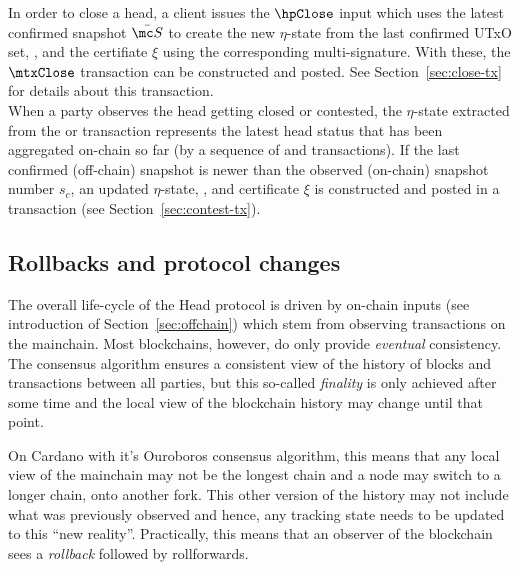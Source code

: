 \quad In order to close a head, a client issues the
$\hpClose$ input which uses the latest confirmed snapshot $\bar{\mc S}$ to
create the new $\eta$-state from the last confirmed UTxO set, , and the certifiate
$\xi$ using the corresponding multi-signature. With these, the $\mtxClose$ transaction
can be constructed and posted. See Section~\ref{sec:close-tx} for details about this
transaction. \\

\quad When a party observes
the head getting closed or contested, the $\eta$-state extracted from the
\mtxClose{} or \mtxContest{} transaction represents the latest head status that
has been aggregated on-chain so far (by a sequence of \mtxClose{} and
\mtxContest{} transactions). If the last confirmed (off-chain) snapshot is newer
than the observed (on-chain) snapshot number $s_{c}$, an updated $\eta$-state,
,
and certificate $\xi$ is constructed and posted in a \mtxContest{} transaction (see
Section~\ref{sec:contest-tx}).

\subsection{Rollbacks and protocol changes}\label{sec:rollbacks}

The overall life-cycle of the Head protocol is driven by on-chain inputs (see
introduction of Section~\ref{sec:offchain}) which stem from observing
transactions on the mainchain. Most blockchains, however, do only provide
\emph{eventual} consistency. The consensus algorithm ensures a consistent view
of the history of blocks and transactions between all parties, but this
so-called \emph{finality} is only achieved after some time and the local view of
the blockchain history may change until that point.

On Cardano with it's Ouroboros consensus algorithm, this means that any local
view of the mainchain may not be the longest chain and a node may switch to a
longer chain, onto another fork. This other version of the history may not
include what was previously observed and hence, any tracking state needs to be
updated to this ``new reality''. Practically, this means that an observer of the
blockchain sees a \emph{rollback} followed by rollforwards.

